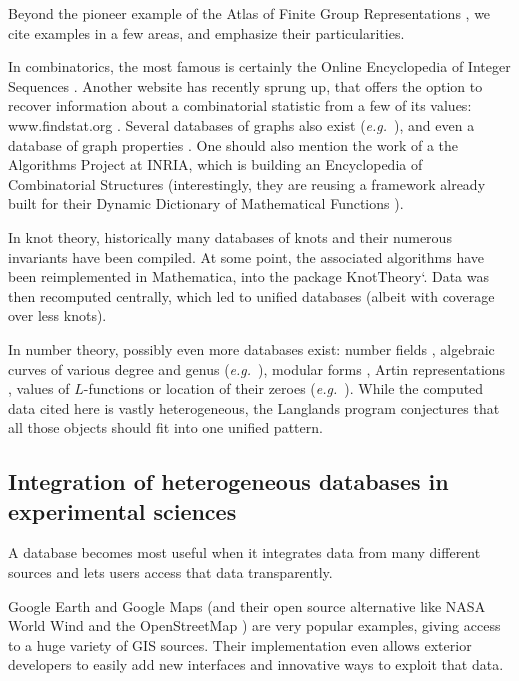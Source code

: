\documentclass{article}
\begin{document}
Beyond the pioneer example of the Atlas of Finite Group Representations \cite{AtlasGroup},  we cite examples in a few areas, and emphasize their particularities. 

In combinatorics, the most famous is certainly the Online Encyclopedia of Integer Sequences \cite{OEIS}. Another website has recently sprung up, that offers the option to recover information about a combinatorial statistic from a few of its values: \textsf{www.findstat.org} \cite{findstat}. Several databases of graphs also exist (\emph{e.g.}~\cite{grout,meringer}), and even a database of graph properties \cite{ISGCI}. One should also mention the work of a the Algorithms Project at INRIA, which is building an Encyclopedia of Combinatorial Structures \cite{ECS} (interestingly, they are reusing a framework already built for their Dynamic Dictionary of Mathematical Functions \cite{DDMF}).


In knot theory, historically many databases of knots and their numerous invariants have been compiled. At some point, the associated algorithms have been reimplemented in Mathematica, into the package \textsf{KnotTheory`}. Data was then recomputed centrally, which led to unified databases \cite{knotinfo,knotatlas} (albeit with coverage over less knots). 

In number theory, possibly even more databases exist: number fields \cite{Jones}, algebraic curves of various degree and genus (\emph{e.g.}~\cite{Cremona, SteinWatkins}), modular forms \cite{SteinMFD}, Artin representations \cite{Dokchitser}, values of $L$-functions or location of their zeroes (\emph{e.g.}~\cite{Odlyzko, Rub1, Rub2, Stefan, Booker}). While the computed data cited here is vastly heterogeneous, the Langlands program conjectures that all those objects should fit into one unified pattern. 

\subsection{Integration of heterogeneous databases in experimental sciences}
A database becomes most useful when it integrates data from many different sources and lets users access that data transparently. 

Google Earth \cite{GEarth} and Google Maps \cite{GMaps} (and their  open source alternative like  NASA World Wind \cite{WorldWind} and the OpenStreetMap \cite{OpenStreet}) are very popular examples, giving access to a huge variety of GIS sources. Their implementation even allows exterior developers to easily add new interfaces and innovative ways to exploit that data. 
\end{document}
